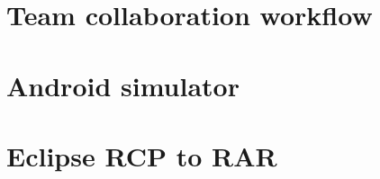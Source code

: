 \documentclass[12pt]{report}
\begin{document}
  \appendix
    \chapter{Team collaboration workflow}

    \chapter{Android simulator}

    \chapter{Eclipse RCP to RAR}

  \pagebreak
  \nocite{*}
  
  

  \pagebreak
  \printindex
\end{document}
